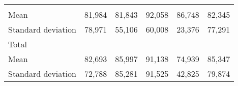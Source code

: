 \begin{tabular}{llllll}
  \multicolumn{1}{|r}{} &
  \multicolumn{1}{r}{} &
  \multicolumn{1}{r}{} &
  \multicolumn{1}{r}{} &
  \multicolumn{1}{r}{} \\
\multicolumn{1}{l}{\hspace{4em}Mean} &
  \multicolumn{1}{|r}{81,984} &
  \multicolumn{1}{r}{81,843} &
  \multicolumn{1}{r}{92,058} &
  \multicolumn{1}{r}{86,748} &
  \multicolumn{1}{r}{82,345} \\
\multicolumn{1}{l}{\hspace{4em}Standard deviation} &
  \multicolumn{1}{|r}{78,971} &
  \multicolumn{1}{r}{55,106} &
  \multicolumn{1}{r}{60,008} &
  \multicolumn{1}{r}{23,376} &
  \multicolumn{1}{r}{77,291} \\
\multicolumn{1}{l}{\hspace{3em}Total} &
  \multicolumn{1}{|r}{} &
  \multicolumn{1}{r}{} &
  \multicolumn{1}{r}{} &
  \multicolumn{1}{r}{} &
  \multicolumn{1}{r}{} \\
\multicolumn{1}{l}{\hspace{4em}Mean} &
  \multicolumn{1}{|r}{82,693} &
  \multicolumn{1}{r}{85,997} &
  \multicolumn{1}{r}{91,138} &
  \multicolumn{1}{r}{74,939} &
  \multicolumn{1}{r}{85,347} \\
\multicolumn{1}{l}{\hspace{4em}Standard deviation} &
  \multicolumn{1}{|r}{72,788} &
  \multicolumn{1}{r}{85,281} &
  \multicolumn{1}{r}{91,525} &
  \multicolumn{1}{r}{42,825} &
  \multicolumn{1}{r}{79,874} \\
\cline{1-6}
\end{tabular}

